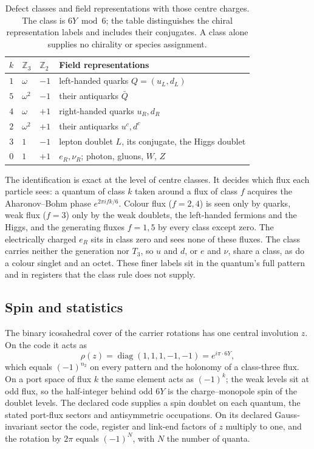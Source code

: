 \begin{table}[htbp]
\centering\small
\caption{Defect classes and field representations with those centre charges.
The class is $6Y\bmod 6$; the table distinguishes the chiral representation labels
and includes their conjugates. A class alone supplies no chirality or species assignment.}
\label{tab:defect-classes}
\begin{tabular}{@{}clll@{}}
\toprule
$k$ & $\mathbb Z_3$ & $\mathbb Z_2$ & Field representations\\
\midrule
$1$ & $\omega$ & $-1$ & left-handed quarks $Q=(u_L,d_L)$\\
$5$ & $\omega^2$ & $-1$ & their antiquarks $\bar Q$\\
$4$ & $\omega$ & $+1$ & right-handed quarks $u_R,d_R$\\
$2$ & $\omega^2$ & $+1$ & their antiquarks $u^c,d^c$\\
$3$ & $1$ & $-1$ & lepton doublet $L$, its conjugate, the Higgs doublet\\
$0$ & $1$ & $+1$ & $e_R,\nu_R$; photon, gluons, $W$, $Z$\\
\bottomrule
\end{tabular}
\end{table}

The identification is exact at the level of centre classes. It decides which flux each
particle sees: a quantum of class $k$ taken around a flux of class $f$ acquires the
Aharonov--Bohm phase $e^{2\pi ifk/6}$. Colour flux ($f=2,4$) is seen only by quarks, weak
flux ($f=3$) only by the weak doublets, the left-handed fermions and the Higgs, and the
generating fluxes $f=1,5$ by every class except zero. The electrically charged $e_R$ sits
in class zero and sees none of these fluxes. The class carries neither the generation nor $T_3$, so $u$ and $d$, or
$e$ and $\nu$, share a class, as do a colour singlet and an octet. These finer labels sit
in the quantum's full pattern and in registers that the class rule does not supply.

\subsection{Spin and statistics}

The binary icosahedral cover of the carrier rotations has one central involution $z$.
On the code it acts as
\[
 \rho(z)=\operatorname{diag}(1,1,1,-1,-1)=e^{i\pi\cdot 6Y},
\]
which equals $(-1)^{n_2}$ on every pattern and the holonomy of a class-three flux. On a
port space of flux $k$ the same element acts as $(-1)^k$; the weak levels sit at odd flux,
so the half-integer behind odd $6Y$ is the charge--monopole spin of the doublet levels.
The declared code supplies a spin doublet on each quantum, the stated port-flux sectors
and antisymmetric occupations. On its declared Gauss-invariant sector the code,
register and link-end factors of $z$ multiply to one, and the rotation by $2\pi$ equals
$(-1)^{N}$, with $N$ the number of quanta.

